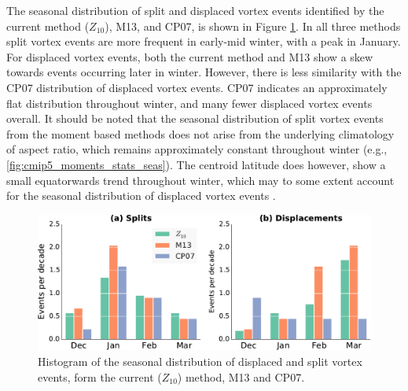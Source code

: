 

The seasonal distribution of split and displaced vortex events identified by the
current method ($Z_{10}$), M13, and CP07, is shown in Figure
\ref{fig:z_m13_cp07_histogram}. In all three methods split vortex events are
more frequent in early-mid winter, with a peak in January. For displaced vortex
events, both the current method and M13 show a skew towards events occurring
later in winter. However, there is less similarity with the CP07 distribution of
displaced vortex events. CP07 indicates an approximately flat distribution
throughout winter, and many fewer displaced vortex events overall. It should be
noted that the seasonal distribution of split vortex events from the moment
based methods does not arise from the underlying climatology of aspect ratio,
which remains approximately constant throughout winter (e.g.,
\ref{fig:cmip5_moments_stats_seas}). The centroid latitude does however, show a
small equatorwards trend throughout winter, which may to some extent account for
the seasonal distribution of displaced vortex events \citep{Mitchell2011}.

\begin{figure}
  \centering
  \noindent\includegraphics[width=\textwidth]{figures/chapter-moments/splits_displacements_histogram.pdf}
  \caption[Seasonal distribution of displaced and split vortex
  events.]{Histogram of the seasonal distribution of displaced and split vortex
    events, form the current ($Z_{10}$) method, M13 and CP07.}
  \label{fig:z_m13_cp07_histogram}
\end{figure}

